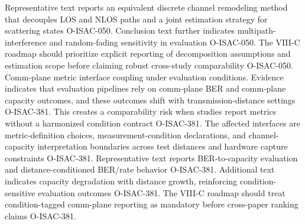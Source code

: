  Representative text reports an equivalent discrete channel remodeling method that decouples LOS and NLOS paths and a joint estimation strategy for scattering states O-ISAC-050. Conclusion text further indicates multipath-interference and random-fading sensitivity in evaluation O-ISAC-050.\markdownRendererOlItemEnd 
{} The VIII-C roadmap should prioritize explicit reporting of decomposition assumptions and estimation scope before claiming robust cross-study comparability O-ISAC-050.\markdownRendererOlItemEnd 
\markdownRendererOlEnd \markdownRendererInterblockSeparator
{}
\markdownRendererSectionEnd \markdownRendererSectionBegin
{}\markdownRendererInterblockSeparator
{}\markdownRendererOlBegin
{} Comm-plane metric interface coupling under evaluation conditions.\markdownRendererOlItemEnd 
{} Evidence indicates that evaluation pipelines rely on comm-plane BER and comm-plane capacity outcomes, and these outcomes shift with transmission-distance settings O-ISAC-381. This creates a comparability risk when studies report metrics without a harmonized condition contract O-ISAC-381.\markdownRendererOlItemEnd 
{} The affected interfaces are metric-definition choices, measurement-condition declarations, and channel-capacity interpretation boundaries across test distances and hardware capture constraints O-ISAC-381.\markdownRendererOlItemEnd 
{} Representative text reports BER-to-capacity evaluation and distance-conditioned BER/rate behavior O-ISAC-381. Additional text indicates capacity degradation with distance growth, reinforcing condition-sensitive evaluation outcomes O-ISAC-381.\markdownRendererOlItemEnd 
{} The VIII-C roadmap should treat condition-tagged comm-plane reporting as mandatory before cross-paper ranking claims O-ISAC-381.\markdownRendererOlItemEnd 
\markdownRendererOlEnd \markdownRendererInterblockSeparator
